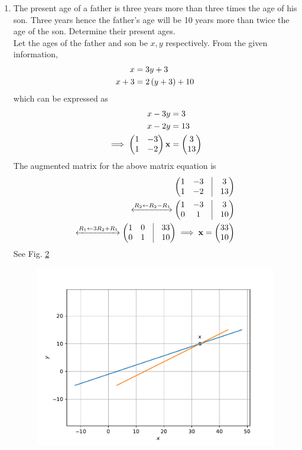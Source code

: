 \documentclass[journal,12pt,twocolumn]{IEEEtran}
\begin{document}
\begin{enumerate}
\begin{figure}
	  \caption{}
	  \label{fig:matrix-10-7.pdf}
	  \end{figure}
        \item The present age of a father is three years more than three times the age of his son. Three years hence the father's age will be 10 years more than twice the age of the son. Determine their present ages.\\
		\solution Let the ages of the father and son be $x, y$ respectively.  From the given information, 
		    \begin{align}
			    x &= 3y+3
			    \\
			    x+3 &= 2\left(y+3\right) + 10
		    \end{align}
		    which can be expressed as 
		    \begin{align}
			    x  -3y &= 3
			    \\
			    x -2y  &= 13
			    \\
			    \implies 
			    \begin{pmatrix}1 &  -3
			    \\
			    1 & -2\end{pmatrix}\mathbf{x} &= \begin{pmatrix}3 \\ 13\end{pmatrix}
		    \end{align}
		    The augmented matrix for the above matrix equation is 
		    \begin{align}
			    \myvec{
				    1 & -3 & \vrule & 3
			    \\
			    1 & -2  &\vrule & 13
		    }
		    \\
		    \xleftrightarrow[]{R_2 \leftarrow R_2 -R_1 }
			    \myvec{
				    1 & -3 & \vrule & 3
			    \\
			    0 & 1  &\vrule & 10
		    }
		    \\
		    \xleftrightarrow[]{R_1 \leftarrow 3R_2 +R_1 }
			    \myvec{
				    1 & 0 & \vrule & 33
			    \\
			    0 & 1  &\vrule & 10
		    }
			    \implies \vec{x} = \myvec{33 \\ 10}
		    \end{align}
    See Fig. 
	  \ref{fig:matrix-10-8.pdf}
  \begin{figure}
	  \centering 
	  \includegraphics[width=\columnwidth]{figs/matrix-10-8.pdf}
	  \caption{}
	  \label{fig:matrix-10-8.pdf}
	  \end{figure}


\end{enumerate}
\end{document}
